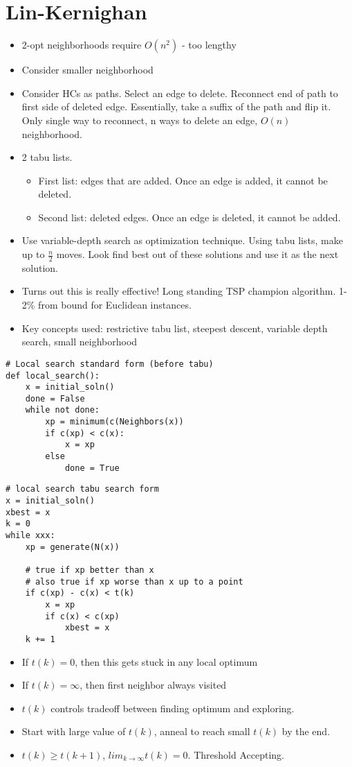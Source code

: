 \documentclass[12pt, letter]{article}
\begin{document}
\section{Lin-Kernighan}%
\label{sec:lin_kernighan}
\begin{itemize}
	\item 2-opt neighborhoods require $O(n^2)$ - too lengthy
	\item Consider smaller neighborhood
	\item Consider HCs as paths. Select an edge to delete. Reconnect end of path to first side of deleted edge. Essentially, take a suffix of the path and flip it. Only single way to reconnect, n ways to delete an edge, $O(n)$ neighborhood.
	\item 2 tabu lists.
	\begin{itemize}
		\item First list: edges that are added. Once an edge is added, it cannot be deleted.
		\item Second list: deleted edges. Once an edge is deleted, it cannot be added.
	\end{itemize}
	\item Use variable-depth search as optimization technique. Using tabu lists, make up to $\frac{n}{2}$ moves. Look find best out of these solutions and use it as the next solution.
	\item Turns out this is really effective! Long standing TSP champion algorithm. 1-2\% from bound for Euclidean instances.
	\item Key concepts used: restrictive tabu list, steepest descent, variable depth search, small neighborhood
\end{itemize}

\begin{verbatim}
# Local search standard form (before tabu)
def local_search():
    x = initial_soln()
    done = False
    while not done:
        xp = minimum(c(Neighbors(x))
        if c(xp) < c(x):
            x = xp
        else
            done = True
\end{verbatim}

\begin{verbatim}
# local search tabu search form
x = initial_soln()
xbest = x
k = 0
while xxx:
    xp = generate(N(x))

    # true if xp better than x
    # also true if xp worse than x up to a point
    if c(xp) - c(x) < t(k)
        x = xp
        if c(x) < c(xp)
            xbest = x
    k += 1
\end{verbatim}
\begin{itemize}
    \item If $t(k) = 0$, then this gets stuck in any local optimum
    \item If $t(k) = \infty$, then first neighbor always visited
    \item $t(k)$ controls tradeoff between finding optimum and exploring.
    \item Start with large value of $t(k)$, anneal to reach small  $t(k)$ by the end.
    \item $t(k) \ge t(k+1)$, $lim_{k\to \infty} t(k) = 0$. Threshold Accepting.
\end{itemize}
\end{document}
